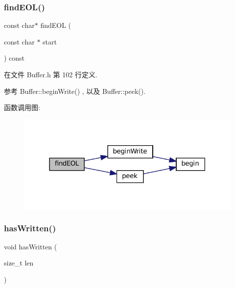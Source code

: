 \subsubsection{\texorpdfstring{find\+E\+O\+L()}{findEOL()}\hspace{0.1cm}{\footnotesize\ttfamily [2/2]}}
{\footnotesize\ttfamily const char$\ast$ find\+E\+OL (\begin{DoxyParamCaption}\item[{const char $\ast$}]{start }\end{DoxyParamCaption}) const\hspace{0.3cm}{\ttfamily [inline]}}



在文件 Buffer.\+h 第 102 行定义.



参考 Buffer\+::begin\+Write() , 以及 Buffer\+::peek().

函数调用图\+:
\nopagebreak
\begin{figure}[H]
\begin{center}
\leavevmode
\includegraphics[width=318pt]{classmuduo_1_1net_1_1Buffer_a29e5dd77acbc70bc4f98301eb84a29f4_cgraph}
\end{center}
\end{figure}
\mbox{\label{classmuduo_1_1net_1_1Buffer_ae29d7ca8954d0ec7da6363221c80a245}} 
\subsubsection{\texorpdfstring{has\+Written()}{hasWritten()}}
{\footnotesize\ttfamily void has\+Written (\begin{DoxyParamCaption}\item[{size\+\_\+t}]{len }\end{DoxyParamCaption})\hspace{0.3cm}{\ttfamily [inline]}}



